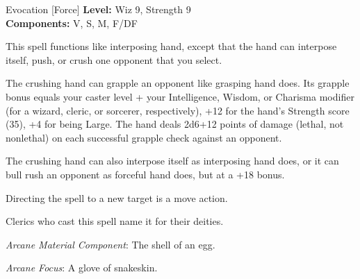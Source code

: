 {Evocation [Force]}
{
	\textbf{Level:}
	Wiz 9, Strength 9\\
	\textbf{Components:}
	V, S, M, F/DF\\
}
{
	This spell functions like interposing hand, except that the hand can interpose itself, push, or crush one opponent that you select.

	The crushing hand can grapple an opponent like grasping hand does. Its grapple bonus equals your caster level + your Intelligence, Wisdom, or Charisma modifier (for a wizard, cleric, or sorcerer, respectively), +12 for the hand's Strength score (35), +4 for being Large. The hand deals 2d6+12 points of damage (lethal, not nonlethal) on each successful grapple check against an opponent.

	The crushing hand can also interpose itself as interposing hand does, or it can bull rush an opponent as forceful hand does, but at a +18 bonus.

	Directing the spell to a new target is a move action.

Clerics who cast this spell name it for their deities.

	\textit{Arcane Material Component}:
	The shell of an egg.

	\textit{Arcane Focus}:
	A glove of snakeskin.

}
